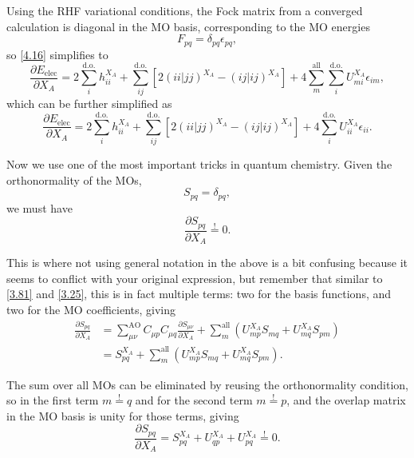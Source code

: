 \documentclass[%
class = book,%
crop = false,%
float = true,%
multi = true,%
preview = false,%
]{standalone}
\begin{document}
Using the RHF variational conditions, the Fock matrix from a converged calculation is diagonal in the MO basis, corresponding to the MO energies
\begin{equation}
  F_{pq} = \delta_{pq} \epsilon_{pq}, \tag{Yamaguchi eq. 4.7}
\end{equation}
so \eqref{4.16} simplifies to
\begin{equation}
  \frac{\partial E_{\text{elec}}}{\partial X_{A}} = 2 \sum_{i}^{\text{d.o.}} h_{ii}^{X_{A}} + \sum_{ij}^{\text{d.o.}} \left[ 2(ii|jj)^{X_{A}} - (ij|ij)^{X_{A}} \right] + 4 \sum_{m}^{\text{all}} \sum_{i}^{\text{d.o.}} U_{mi}^{X_{A}} \epsilon_{im}, \tag{Yamaguchi eq. 4.17 modified}
\end{equation}
which can be further simplified as
\begin{equation}
  \frac{\partial E_{\text{elec}}}{\partial X_{A}} = 2 \sum_{i}^{\text{d.o.}} h_{ii}^{X_{A}} + \sum_{ij}^{\text{d.o.}} \left[ 2(ii|jj)^{X_{A}} - (ij|ij)^{X_{A}} \right] + 4 \sum_{i}^{\text{d.o.}} U_{ii}^{X_{A}} \epsilon_{ii}. \tag{Yamaguchi eq. 4.17}
\end{equation}

Now we use one of the most important tricks in quantum chemistry. Given the orthonormality of the MOs,
\begin{equation}
S_{pq} = \delta_{pq}, \tag{Yamaguchi eq. 3.44}
\end{equation}
we must have
\begin{equation}
  \frac{\partial S_{pq}}{\partial X_{A}} \overset{!}{=} 0. \tag{Yamaguchi eq. 3.45}
\end{equation}

This is where not using general notation in the above is a bit confusing because it seems to conflict with your original expression, but remember that similar to \eqref{3.81} and \eqref{3.25}, this is in fact multiple terms: two for the basis functions, and two for the MO coefficients, giving
\begin{align*}
\frac{\partial S_{pq}}{\partial X_{A}} &= \sum_{\mu\nu}^{\text{AO}} C_{\mu p} C_{\mu q} \frac{\partial S_{\mu\nu}}{\partial X_{A}} + \sum_{m}^{\text{all}} \left( U_{mp}^{X_{A}} S_{mq} + U_{mq}^{X_{A}} S_{pm} \right) \tag{Yamaguchi eqs. 3.40 + 3.43} \\
                                       &= S_{pq}^{X_{A}} + \sum_{m}^{\text{all}} \left( U_{mp}^{X_{A}} S_{mq} + U_{mq}^{X_{A}} S_{pm} \right). \tag{Yamaguchi eq. 3.43}
\end{align*}

The sum over all MOs can be eliminated by reusing the orthonormality condition, so in the first term \(m \overset{!}{=} q\) and for the second term \(m \overset{!}{=} p\), and the overlap matrix in the MO basis is unity for those terms, giving
\begin{equation}
  \frac{\partial S_{pq}}{\partial X_{A}} = S_{pq}^{X_{A}} + U_{qp}^{X_{A}} + U_{pq}^{X_{A}} \overset{!}{=} 0. \tag{Yamaguchi eq. 3.46}
\end{equation}
\end{document}
